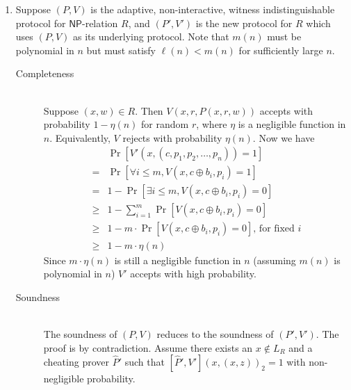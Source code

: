 \documentclass[draft]{article}
\newcommand{\class}[1]{{\ensuremath{\mathsf{#1}}}}
\newcommand{\NP}{\class{NP}}
\begin{document}
\begin{enumerate}
\item
  Suppose $(P, V)$ is the adaptive, non-interactive, witness indistinguishable protocol for $\NP$-relation $R$, and $(P', V')$ is the new protocol for $R$ which uses $(P, V)$ as its underlying protocol.
  Note that $m(n)$ must be polynomial in $n$ but must satisfy $\ell(n)< m(n)$ for sufficiently large $n$.
  \begin{description}
  \item[Completeness] \hfill \\
    Suppose $(x, w)\in R$.
    Then $V(x, r, P(x, r, w))$ accepts with probability $1-\eta(n)$ for random $r$, where $\eta$ is a negligible function in $n$.
    Equivalently, $V$ rejects with probability $\eta(n)$.
    Now we have
    \begin{align*}
           & \Pr\left[V'(x, (c, p_1, p_2, \dots, p_n)) = 1\right] \\
         = & \Pr\left[\forall i\leq m, V(x, c\oplus b_i, p_i) = 1\right] \\
         = & 1 - \Pr\left[\exists i\leq m, V(x, c\oplus b_i, p_i) = 0\right] \\
      \geq & 1 - \sum_{i=1}^m \Pr\left[V(x, c\oplus b_i, p_i) = 0\right] \\
      \geq & 1 - m \cdot \Pr\left[V(x, c\oplus b_i, p_i) = 0\right]\text{, for fixed } i\\
      \geq & 1 - m\cdot\eta(n)
    \end{align*}
    Since $m\cdot\eta(n)$ is still a negligible function in $n$ (assuming $m(n)$ is polynomial in $n$) $V'$ accepts with high probability.
  \item[Soundness] \hfill \\
    The soundness of $(P, V)$ reduces to the soundness of $(P', V')$.
    The proof is by contradiction.
    Assume there exists an $x\notin L_R$ and a cheating prover $\hat{P}'$ such that $[\hat{P}', V'](x, (x, z))_2=1$ with non-negligible probability.


\end{description}
\end{enumerate}
\end{document}
